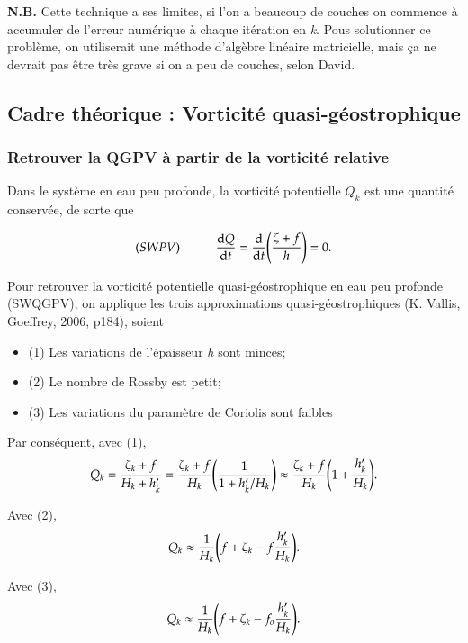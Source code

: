\documentclass{article}
\numberwithin{equation}{section}
\begin{document}
\textbf{N.B.} Cette technique a ses limites, si l'on a beaucoup de couches on commence à accumuler de l'erreur numérique à chaque itération en \emph{k}.
Pous solutionner ce problème, on utiliserait une méthode d'algèbre linéaire matricielle, mais ça ne devrait pas être très grave si on a peu de couches, selon David.

\subsection{\textbf{Cadre théorique} : Vorticité quasi-géostrophique}
\label{sec:org7f4aff9}
\subsubsection{Retrouver la QGPV à partir de la vorticité relative}
\label{sec:org7b254b6}

Dans le système en eau peu profonde, la vorticité potentielle \(Q_k\) est une quantité conservée, de sorte que 

\begin{equation}
(SWPV) \hspace{1cm} \dv{Q}{t} = \dv{t} \qty(\frac{\zeta + f}{h}) = 0.       
\end{equation}

Pour retrouver la vorticité potentielle quasi-géostrophique en eau peu profonde (SWQGPV), on applique les trois approximations quasi-géostrophiques (K. Vallis, Goeffrey, 2006, p184), soient
\begin{itemize}
\item (1) Les variations de l'épaisseur \emph{h} sont minces;
\item (2) Le nombre de Rossby est petit;
\item (3) Les variations du paramètre de Coriolis sont faibles
\end{itemize}
Par conséquent, avec (1),
\begin{align}
Q_k = \frac{\zeta_k + f}{H_k+h_k'} 
= \frac{\zeta_k + f}{H_k}  \qty( \frac{1}{1 + h_k'/H_k})  
\approx \frac{\zeta_k + f}{H_k}  \qty(1 + \frac{h_k'}{H_k}).
\end{align}

Avec (2),
\begin{align}
Q_k \approx \frac{1}{H_k}  \qty(f + \zeta_k -f\frac{h_k'}{H_k}).
\end{align}

Avec (3), 
\begin{align}
Q_k \approx \frac{1}{H_k}  \qty(f + \zeta_k -f_o\frac{h_k'}{H_k}).
\end{align}
\end{document}
